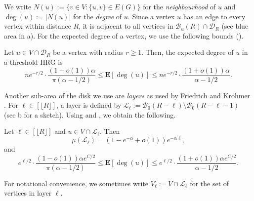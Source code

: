 \documentclass[letterpaper,11pt]{article}
\newcommand{\E}[1]{\mathbf{E}\left[#1\right]}
\newcommand{\B}{\mathcal B}
\newcommand{\disk}{\ensuremath{\mathcal D_R}\xspace}
\newcommand{\1}{\mathbb I}
\newcommand{\Layer}[1]{\mathcal{L}_{#1}}
\begin{document}
%
We write $N(u) := \{v \in V : \{u,v\} \in E(G)\}$ for the \emph{neighbourhood} of $u$ and $\deg(u) := |N(u)|$ for the \emph{degree} of $u$. Since a vertex $u$ has an edge to every vertex within distance $R$, it is adjacent to all vertices in $\B_u(R) \cap \disk$ (see blue area in a). For the expected degree of a vertex, we use the following bounds (\cite[Lemma 7]{mr-soda-26}).
%
\begin{lemma}\label{lem:vertex-degree}
    Let $u \in V \cap \disk$ be a vertex with radius $r\geq 1$. Then, the expected degree of $u$ in a threshold HRG is 
    $$
    n e^{-r/2}\cdot\frac{(1-o(1))\alpha }{\pi(\alpha-1/2)} \leq \E{\deg(u)} 
        \leq ne^{-r/2}\cdot \frac{ (1+o(1))\alpha}{\alpha-1/2}.
    $$
\end{lemma}
%
Another sub-area of the disk we use are \emph{layers} as used by Friedrich and Krohmer \cite{fk-dhrg-18}. For $\ell \in [\lfloor R \rfloor]$, a {layer} is defined by $\Layer{\ell}:= \B_0(R-\ell)\setminus \B_0(R-\ell-1)$ (see b for a sketch). Using  and , we obtain the following.
%
\begin{lemma} 
\label{lem:layer-properties} Let $\ell \in [\lfloor R \rfloor]$ and $u \in V \cap \Layer{\ell}$. Then
%
\begin{equation} \label{eq:layer_measure}
    \mu(\Layer{\ell}) =  (1-e^{-\alpha} +o(1)) e^{-\alpha \ell},
\end{equation}
%
and 
%
    \begin{equation} \label{eq:layer_expected_degree}
e^{\ell/2} \cdot \frac{ (1-o(1))\alpha e^{C/2}}{\pi(\alpha-1/2)} \leq \E{\deg(u)} \leq e^{\ell/2} \cdot \frac{ (1+o(1))\alpha e^{C/2}}{\alpha-1/2}.
\end{equation}
%
\end{lemma}
%
For notational convenience, we sometimes write $V_\ell := V \cap \Layer{\ell}$ for the set of vertices in layer $\ell$.
\end{document}
